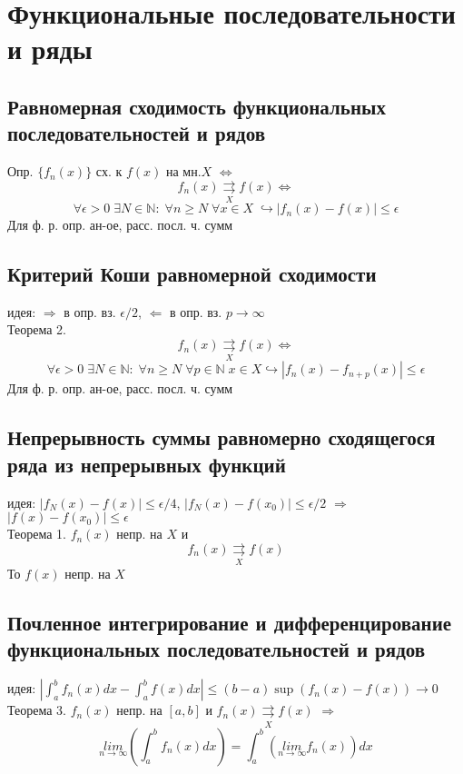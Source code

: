 \documentclass{article}
\begin{document}
\newpage
\section{Функциональные последовательности и ряды}
\subsection{Равномерная сходимость функциональных последовательностей и рядов}
Опр. $\{ f_n (x) \}$ сх. к $f(x)$ на мн.$X$ $\Leftrightarrow$
\begin{equation*}
    f_n (x) \underset{X}{\rightrightarrows} f(x) \Leftrightarrow
\end{equation*}
\begin{equation*}
    \forall \epsilon > 0 \; \exists N \in \mathbb N: \; \forall n \geq N \; \forall x \in X \; \hookrightarrow |f_n (x) - f(x)| \leq \epsilon
\end{equation*}
Для ф. р. опр. ан-ое, расс. посл. ч. сумм
\subsection{Критерий Коши равномерной сходимости}
идея: $\Rightarrow$ в опр. вз. $\epsilon/2$, $\Leftarrow$ в опр. вз. $p \rightarrow \infty$ \\
Теорема 2.
\begin{equation*}
    f_n (x) \underset{X}{\rightrightarrows} f(x) \Leftrightarrow
\end{equation*}
\begin{equation*}
    \forall \epsilon>0 \; \exists N \in \mathbb N: \; \forall n \geq N \; \forall p \in \mathbb N \; x \in X \hookrightarrow |f_n (x)-f_{n+p}(x)| \leq \epsilon
\end{equation*}
Для ф. р. опр. ан-ое, расс. посл. ч. сумм
\subsection{Непрерывность суммы равномерно сходящегося ряда из непрерывных функций}
идея: $|f_N(x) - f(x)| \leq \epsilon/4$, $|f_N(x)-f(x_0)| \leq \epsilon/2$ $\Rightarrow$ $|f(x)-f(x_0)| \leq \epsilon$ \\
Теорема 1. $f_n(x)$ непр. на $X$ и
\begin{equation*}
    f_n (x) \underset{X}{\rightrightarrows} f(x)
\end{equation*}
То $f(x)$ непр. на $X$
\subsection{Почленное интегрирование и дифференцирование функциональных последовательностей и рядов}
идея: $|\int_a^b f_n(x) dx - \int_a^b f(x) dx| \leq (b-a) \sup (f_n(x)-f(x)) \rightarrow 0$ \\
Теорема 3. $f_n(x)$ непр. на $[a,b]$ и $f_n (x) \underset{X}{\rightrightarrows} f(x)$ $\Rightarrow$
\begin{equation*}
    \underset{n \rightarrow \infty}{lim} (\int_a^b f_n(x) dx) = \int_a^b (\underset{n \rightarrow \infty}{lim} f_n (x)) dx
\end{equation*}
\end{document}
